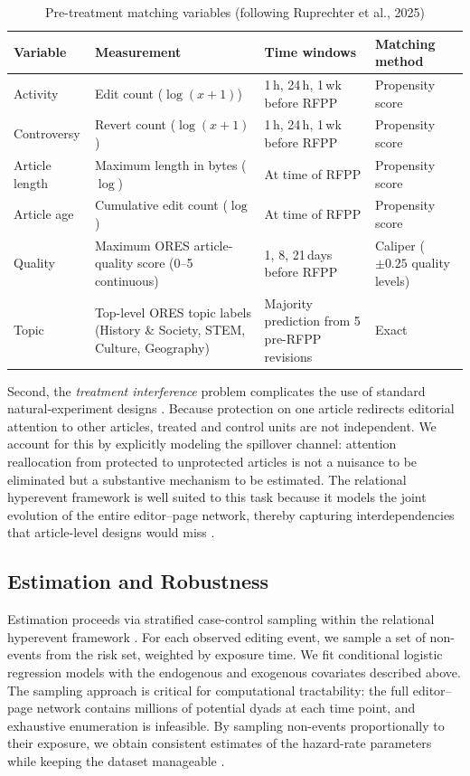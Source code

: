 \documentclass[11pt]{article}
\begin{document}
\begin{table}[ht]
\centering
\small
\singlespacing
\caption{Pre-treatment matching variables (following Ruprechter et al., 2025)}
\label{tab:matching}
\renewcommand{\arraystretch}{1.25}
\begin{tabular}{p{2.8cm} p{4.2cm} p{3cm} p{2.5cm}}
\toprule
\textbf{Variable} & \textbf{Measurement} & \textbf{Time windows} & \textbf{Matching method} \\
\midrule
Activity & Edit count ($\log(x+1)$) & 1\,h, 24\,h, 1\,wk before RFPP & Propensity score \\
Controversy & Revert count ($\log(x+1)$) & 1\,h, 24\,h, 1\,wk before RFPP & Propensity score \\
Article length & Maximum length in bytes ($\log$) & At time of RFPP & Propensity score \\
Article age & Cumulative edit count ($\log$) & At time of RFPP & Propensity score \\
Quality & Maximum ORES article-quality score (0--5 continuous) & 1, 8, 21\,days before RFPP & Caliper ($\pm 0.25$ quality levels) \\
Topic & Top-level ORES topic labels (History \& Society, STEM, Culture, Geography) & Majority prediction from 5 pre-RFPP revisions & Exact \\
\bottomrule
\end{tabular}
\end{table}

Second, the \emph{treatment interference} problem complicates the use of standard natural-experiment designs \citep{Dunning2012, Sieweke2020, Jacquart2024}. Because protection on one article redirects editorial attention to other articles, treated and control units are not independent. We account for this by explicitly modeling the spillover channel: attention reallocation from protected to unprotected articles is not a nuisance to be eliminated but a substantive mechanism to be estimated. The relational hyperevent framework is well suited to this task because it models the joint evolution of the entire editor--page network, thereby capturing interdependencies that article-level designs would miss \citep{Sinclair2012}.

\subsection{Estimation and Robustness}

Estimation proceeds via stratified case-control sampling within the relational hyperevent framework \citep{Lerner2020}. For each observed editing event, we sample a set of non-events from the risk set, weighted by exposure time. We fit conditional logistic regression models with the endogenous and exogenous covariates described above. The sampling approach is critical for computational tractability: the full editor--page network contains millions of potential dyads at each time point, and exhaustive enumeration is infeasible. By sampling non-events proportionally to their exposure, we obtain consistent estimates of the hazard-rate parameters while keeping the dataset manageable \citep{Bianchi2024}.
\end{document}

